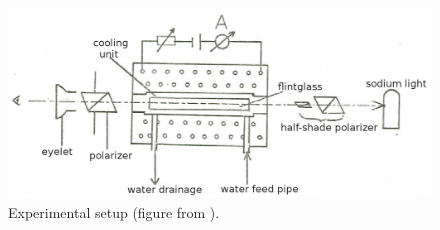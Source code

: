 \begin{figure}
    \begin{centering}
        \includegraphics[width=18cm]{figures/faraday_setup2}
        \caption{Experimental setup (figure from \cite{staatsexamen}).}
        \label{fig:faraday_setup}
    \end{centering}
\end{figure}

